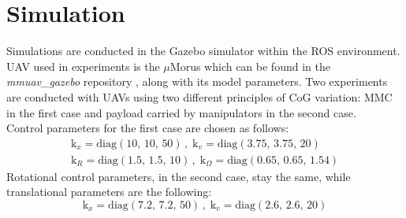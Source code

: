 \section{Simulation} \label{sec:simulation}
Simulations are conducted in the Gazebo simulator within the ROS environment. UAV used in experiments is the $\mu$Morus which can be found in the \textit{mmuav\_gazebo} repository \cite{gitLink}, along with its model parameters. Two experiments are conducted with UAVs using two different principles of CoG variation: MMC in the first case and payload carried by manipulators in the second case. \\
Control parameters for the first case are chosen as follows:
\begin{gather*}
	\text{k}_x = \text{diag}(10, \, 10, \, 50) \, , \; \text{k}_v = \text{diag}(3.75, \, 3.75, \, 20) \\
	\text{k}_R = \text{diag}(1.5, \, 1.5, \, 10) \, , \; \text{k}_\Omega = \text{diag}(0.65, \, 0.65, \, 1.54)	
\end{gather*}
\noindent Rotational control parameters, in the second case, stay the same, while translational parameters are the following: 
\begin{equation*}
\text{k}_x = \text{diag}(7.2, \, 7.2, \, 50) \, , \; \text{k}_v = \text{diag}(2.6, \, 2.6, \, 20)
\end{equation*}

